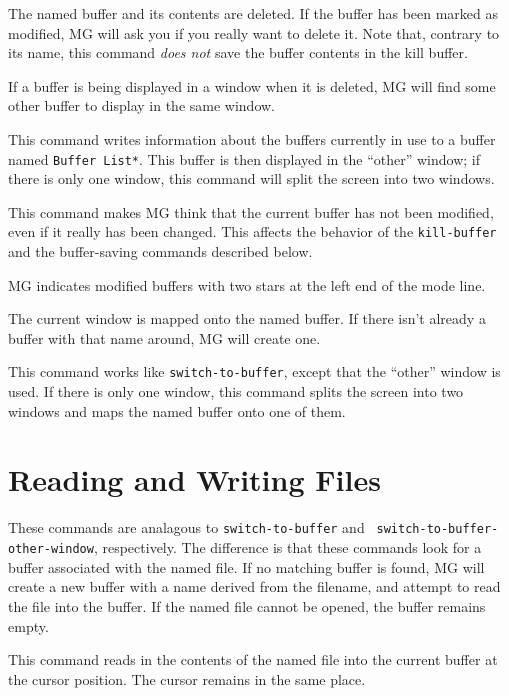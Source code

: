 \fbody The named buffer and its contents are deleted.  If the buffer has
been marked as modified, MG will ask you if you really want to delete it.
Note that, contrary to its name, this command {\em does not\/} save the
buffer contents in the kill buffer.

If a buffer is being displayed in a window when it is deleted, MG will 
find some other buffer to display in the same window.

\fbody This command writes information about the buffers currently in
use to a buffer named {\tt *Buffer List*}.  This buffer is then displayed
in the ``other'' window; if there is only one window, this command will
split the screen into two windows.

\fbody This command makes MG think that the current buffer has not been
modified, even if it really has been changed.  This affects the behavior
of the {\tt kill-buffer} and the buffer-saving commands described below.

MG indicates modified buffers with two stars at the left end of the mode
line.

\fbody The current window is mapped onto the named buffer.  If there
isn't already a buffer with that name around, MG will create one.

\fbody This command works like {\tt switch-to-buffer}, except that the
``other'' window is used.  If there is only one window, this command
splits the screen into two windows and maps the named buffer onto one
of them.

\section{Reading and Writing Files}

\fbody These commands are analagous to {\tt switch-to-buffer} and {\tt
switch-to-buffer-other-window}, respectively.  The difference is that
these commands look for a buffer associated with the named file.  If no
matching buffer is found, MG will create a new buffer with a name
derived from the filename, and attempt to read the file into the buffer.
If the named file cannot be opened, the buffer remains empty.

\fbody This command reads in the contents of the named file into the
current buffer at the cursor position.  The cursor remains in the same
place.

